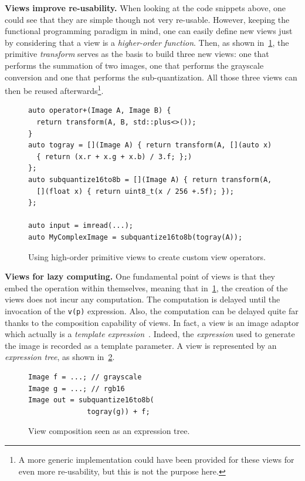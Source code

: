 \textbf{Views improve re-usability.} When looking at the code snippets above, one could see that they are simple though
not very re-usable. However, keeping the functional programming paradigm in mind, one can easily define new views just
by considering that a view is a \emph{higher-order function}. Then, as shown in~\cref{fig.view.highorder}, the primitive
\emph{transform} serves as the basis to build three new views: one that performs the summation of two images, one that
performs the grayscale conversion and one that performs the sub-quantization. All those three views can then be reused
afterwards\footnote{A more generic implementation could have been provided for these views for even more re-usability,
  but this is not the purpose here.}.

\begin{figure}
  \noindent
  \begin{verbatim}
auto operator+(Image A, Image B) {
  return transform(A, B, std::plus<>());
}
auto togray = [](Image A) { return transform(A, [](auto x)
  { return (x.r + x.g + x.b) / 3.f; };)
};
auto subquantize16to8b = [](Image A) { return transform(A,
  [](float x) { return uint8_t(x / 256 +.5f); });
};

auto input = imread(...);
auto MyComplexImage = subquantize16to8b(togray(A));
  \end{verbatim}

  \caption{Using high-order primitive views to create custom view operators.}
  \label{fig.view.highorder}
\end{figure}

\textbf{Views for lazy computing.} One fundamental point of views is that they embed the operation within themselves,
meaning that in~\cref{fig.view.highorder}, the creation of the views does not incur any computation. The computation is
delayed until the invocation of the \texttt{v(p)} expression. Also, the computation can be delayed quite far thanks to
the composition capability of views. In fact, a view is an image adaptor which actually is a \emph{template
  expression}~\parencite{veldhuizen.1995.expression, veldhuizen.2000.blitz}. Indeed, the \emph{expression} used to
generate the image is recorded as a template parameter. A view is represented by an \emph{expression tree}, as shown
in~\cref{fig.view.ast}.


\begin{figure}
  \null\hfill
  \begin{minipage}[b]{2cm}
    
  \end{minipage}
  \begin{minipage}[b]{5.5cm}
    \begin{verbatim}
Image f = ...; // grayscale
Image g = ...; // rgb16
Image out = subquantize16to8b(
              togray(g)) + f;
\end{verbatim}
  \end{minipage}
  \caption{View composition seen as an expression tree.}
  \label{fig.view.ast}
\end{figure}



